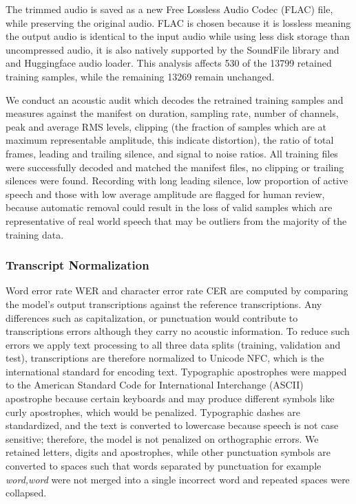 { The trimmed audio is saved as a new Free Lossless Audio Codec (FLAC) file, while preserving the original audio. FLAC is chosen because it is lossless meaning the output audio is identical to the input audio while using less disk storage than uncompressed audio, it is also natively supported by the SoundFile library and and Huggingface audio loader. This analysis affects 530 of the 13799 retained training samples, while the remaining 13269 remain unchanged. 

 We conduct an acoustic audit which decodes the retrained training samples and measures against the manifest on duration, sampling rate, number of channels, peak and average RMS levels, clipping (the fraction of samples which are at maximum representable amplitude, this indicate distortion), the ratio of total frames, leading and trailing silence, and signal to noise ratios. All training files were successfully decoded and matched the manifest files, no clipping or trailing silences were found. Recording with long leading silence, low proportion of active speech and those with low average amplitude are flagged for human review, because automatic removal could result in the loss of valid samples which are representative of real world speech that may be outliers from the majority of the training data.

\subsubsection{Transcript Normalization}
\label{sec:normalization}
Word error rate WER and character error rate CER are computed by comparing the model's output transcriptions against the reference transcriptions. Any differences such as capitalization, or punctuation would contribute to transcriptions errors although they carry no acoustic information. To reduce such errors we apply text processing to all three data splits (training, validation and test), transcriptions are therefore normalized to Unicode NFC, which is the international standard for encoding text. Typographic apostrophes were mapped to the American Standard Code for International Interchange (ASCII) apostrophe because certain keyboards and may produce different symbols like curly apostrophes, which would be penalized. Typographic dashes are standardized, and the text is converted to lowercase because speech is not case sensitive; therefore, the model is not penalized on orthographic errors. We retained letters, digits and apostrophes, while other punctuation symbols are converted to spaces such that words separated by punctuation for example \emph{word,word} were not merged into a single incorrect word and repeated spaces were collapsed. 

}
